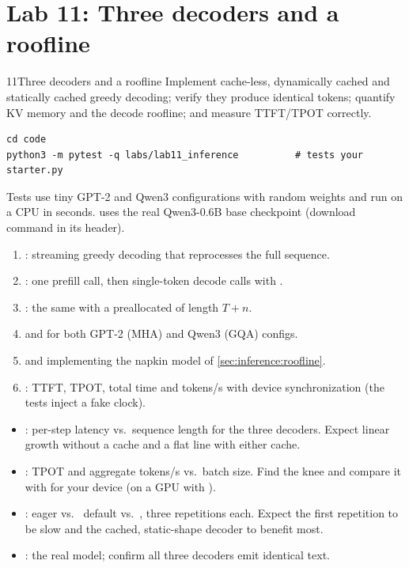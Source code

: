 \section{Lab 11: Three decoders and a roofline}\label{sec:inference:lab}
\begin{labbox}{11}{Three decoders and a roofline}
Implement cache-less, dynamically cached and statically cached greedy decoding; verify they produce
identical tokens; quantify KV memory and the decode roofline; and measure TTFT/TPOT correctly.

\begin{lstlisting}[style=shell]
cd code
python3 -m pytest -q labs/lab11_inference          # tests your starter.py
\end{lstlisting}
Tests use tiny GPT-2 and Qwen3 configurations with random weights and run on a CPU in seconds.
 uses the real Qwen3-0.6B base checkpoint (download command in its header).

\begin{enumerate}
  \item {}: streaming greedy decoding that reprocesses the full sequence.
  \item {}: one prefill call, then single-token decode calls with .
  \item {}: the same with a preallocated  of length $T+n$.
  \item {} and  for both GPT-2 (MHA) and Qwen3 (GQA) configs.
  \item {} and  implementing the napkin model of \cref{sec:inference:roofline}.
  \item {}: TTFT, TPOT, total time and tokens/s with device synchronization
    (the tests inject a fake clock).
\end{enumerate}

\begin{itemize}
  \item {}: per-step latency vs.\ sequence length for the
    three decoders. Expect linear growth without a cache and a flat line with either cache.
  \item {}: TPOT and aggregate tokens/s vs.\ batch size. Find the knee and
    compare it with  for your device (on a GPU with ).
  \item {}: eager vs.\  default vs.\
    , three repetitions each. Expect the first repetition to be slow and the
    cached, static-shape decoder to benefit most.
  \item {}: the real model; confirm all three decoders emit identical text.
\end{itemize}


\end{labbox}
